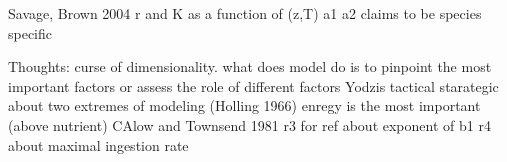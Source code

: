  Savage, Brown 2004 r and K as a function of (z,T)
 a1 a2 claims to be species specific
 
 
 
 Thoughts: curse of dimensionality. what does model do is to pinpoint the most important factors or assess the role of different factors
 Yodzis
 tactical starategic about two extremes of modeling (Holling 1966)
enregy is the most important (above nutrient) CAlow and Townsend 1981
r3 for ref about exponent of b1
r4 about maximal ingestion rate